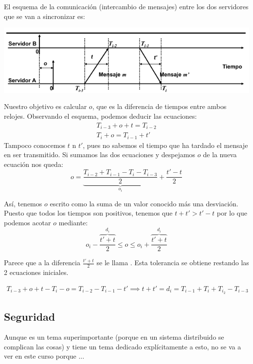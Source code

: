 \begin{example}
El esquema de la comunicación (intercambio de mensajes) entre los dos servidores que se van a sincronizar es:
\begin{center}
\includegraphics[width=1\textwidth]{img/ntp.png}
\label{ejemplo_tiempos}
\end{center}

Nuestro objetivo es calcular $o$, que es la diferencia de tiempos entre ambos relojes. Observando el esquema, podemos deducir las ecuaciones:
\begin{align}
T_{i-3}+o+t=T_{i-2}\\
T_{i}+o=T_{i-1}+t'
\end{align}
Tampoco conocemos $t$ n $t'$, pues no sabemos el tiempo que ha tardado el mensaje en ser transmitido. Si sumamos las dos ecuaciones y despejamos $o$ de la nueva ecuación nos queda:
\[o=\underbrace{\frac{T_{i-2}+T_{i-1}-T_i-T_{i-3}}{2}}_{o_i}+\frac{t'-t}{2}\]

Así, tenemos $o$ escrito como la suma de un valor conocido más una desviación. Puesto que todos los tiempos son positivos, tenemos que $t+t'>t'-t$ por lo que podemos acotar $o$ mediante:
\[o_i-\frac{\overbrace{t'+t}^{d_i}}{2}\leq o \leq o_i + \frac{\overbrace{t'+t}^{d_i}}{2}\]

Parece que a la diferencia $\frac{t'+t}{2}$ se le llama . Esta tolerancia se obtiene restando las 2 ecuaciones iniciales.

\begin{align}
T_{i-3} + o + t - T_i - o = T_{i-2} - T_{i-1} -t' \implies t+t'=d_i=T_{i-1}+T_i+T_{i_2}-T_{i-3}
\end{align}

\end{example}


\subsection{Seguridad}
Aunque es un tema superimportante (porque en un sistema distribuido se complican las cosas) y tiene un tema dedicado explícitamente a esto, no se va a ver en este curso porque ...

